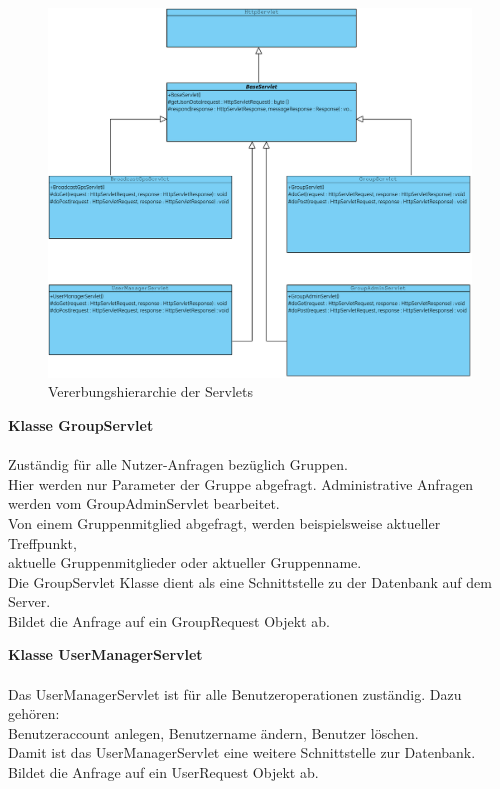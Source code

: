 \begin{figure}[h]
     \centering
     \hspace*{-2.9cm}\includegraphics[scale=0.7]{servergraphs/servlets.pdf}
     \caption{Vererbungshierarchie der Servlets}
\end{figure}
\clearpage
\newpage
\textbf{Klasse GroupServlet} \\
\\
Zuständig für alle Nutzer-Anfragen bezüglich Gruppen. \\
Hier werden nur Parameter der Gruppe abgefragt. Administrative Anfragen werden vom GroupAdminServlet bearbeitet.\\
Von einem Gruppenmitglied abgefragt, werden beispielsweise aktueller Treffpunkt,\\
aktuelle Gruppenmitglieder oder aktueller Gruppenname.\\
Die GroupServlet Klasse dient als eine Schnittstelle zu der Datenbank auf dem Server.\\
Bildet die Anfrage auf ein GroupRequest Objekt ab.

\textbf{Klasse UserManagerServlet} \\
\\
Das UserManagerServlet ist für alle Benutzeroperationen zuständig. Dazu gehören:\\
Benutzeraccount anlegen, Benutzername ändern, Benutzer löschen.\\
Damit ist das UserManagerServlet eine weitere Schnittstelle zur Datenbank.\\
Bildet die Anfrage auf ein UserRequest Objekt ab.

